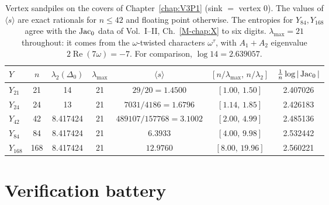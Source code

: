 \begin{table}[ht]
\centering\small
\renewcommand{\arraystretch}{1.2}
\begin{tabular}{lcccccc}
\toprule
$Y$ & $n$ & $\lambda_2(\Delta_0)$ & $\lambda_{\max}$ & $\langle s\rangle$ & $[n/\lambda_{\max},\,n/\lambda_2]$ & $\frac1n\log|\operatorname{Jac}_0|$\\
\midrule
$Y_{21}$ & 21 & 14 & 21 & $29/20=1.4500$ & $[1.00,\,1.50]$ & 2.407026\\
$Y_{24}$ & 24 & 13 & 21 & $7031/4186=1.6796$ & $[1.14,\,1.85]$ & 2.426183\\
$Y_{42}$ & 42 & 8.417424 & 21 & $489107/157768=3.1002$ & $[2.00,\,4.99]$ & 2.485136\\
$Y_{84}$ & 84 & 8.417424 & 21 & $6.3933$ & $[4.00,\,9.98]$ & 2.532442\\
$Y_{168}$ & 168 & 8.417424 & 21 & $12.9760$ & $[8.00,\,19.96]$ & 2.560221\\
\bottomrule
\end{tabular}
\medskip
\caption{Vertex sandpiles on the covers of Chapter~\ref{chap:V3P1} (sink $=$ vertex $0$). The values of
$\langle s\rangle$ are exact rationals for $n\le42$ and floating point otherwise. The
entropies for $Y_{84},Y_{168}$ agree with the $\operatorname{Jac}_0$ data of Vol.~I--II,
Ch.~\ref{M-chap:X} to six digits. $\lambda_{\max}=21$ throughout: it comes from the
$\omega$-twisted characters $\omega^{\tau}$, with $A_1+A_2$ eigenvalue $2\operatorname{Re}
(7\omega)=-7$. For comparison, $\log14=2.639057$.}
\label{V3P2:tab:covers}
\end{table}

\section{Verification battery}\label{V3P2:sec:battery}

